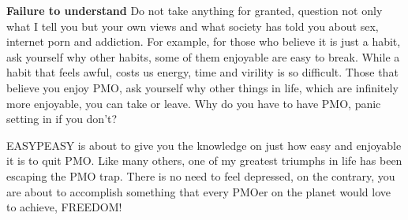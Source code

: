 \documentclass[easypeasy.tex]{subfiles}
\begin{document}
\textbf{Failure to understand}
Do not take anything for granted, question not only what I tell you but your own views and what society has told you about sex, internet porn and addiction. For example, for those who believe it is just a habit, ask yourself why other habits, some of them enjoyable are easy to break. While a habit that feels awful, costs us energy, time and virility is so difficult. Those that believe you enjoy PMO, ask yourself why other things in life, which are infinitely more enjoyable, you can take or leave. Why do you have to have PMO, panic setting in if you don't?

EASYPEASY is about to give you the knowledge on just how easy and enjoyable it is to quit PMO. Like many others, one of my greatest triumphs in life has been escaping the PMO trap. There is no need to feel depressed, on the contrary, you are about to accomplish something that every PMOer on the planet would love to achieve, FREEDOM!
\end{document}
